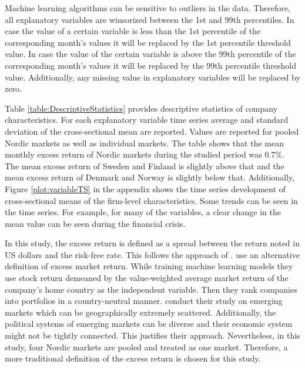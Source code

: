 \documentclass[12pt]{article}
\begin{document}
Machine learning algorithms can be sensitive to outliers in the data. Therefore, all explanatory variables are winsorized between the 1st and 99th percentiles. In case the value of a certain variable is less than the 1st percentile of the corresponding month's values it will be replaced by the 1st percentile threshold value. In case the value of the certain variable is above the 99th percentile of the corresponding month's values it will be replaced by the 99th percentile threshold value. %
Additionally, any missing value in explanatory variables will be replaced by zero. \par

Table \ref{table:DescriptiveStatistics} provides descriptive statistics of company characteristics. For each explanatory variable time series average and standard deviation of the cross-sectional mean are reported. Values are reported for pooled Nordic markets as well as individual markets. The table shows that the mean monthly excess return of Nordic markets during the studied period was 0.7\%. The mean excess return of Sweden and Finland is slightly above that and the mean excess return of Denmark and Norway is slightly below that. Additionally, Figure \ref{plot:variableTS} in the appendix shows the time series development of cross-sectional means of the firm-level characteristics. Some trends can be seen in the time series. For example, for many of the variables, a clear change in the mean value can be seen during the financial crisis. 

In this study, the excess return is defined as a spread between the return noted in US dollars and the risk-free rate. This follows the approach of \citet{guetal}. \citet{HANAUER2023} use an alternative definition of excess market return. While training machine learning models they use stock return demeaned by the value-weighted average market return of the company's home country as the independent variable. Then they rank companies into portfolios in a country-neutral manner. \citeauthor{HANAUER2023} conduct their study on emerging markets which can be geographically extremely scattered. Additionally, the political systems of emerging markets can be diverse and their economic system might not be tightly connected. This justifies their approach. Nevertheless, in this study, four Nordic markets are pooled and treated as one market. Therefore, a more traditional definition of the excess return is chosen for this study. \par
\end{document}
